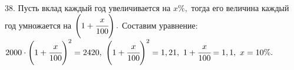 38. Пусть вклад каждый год увеличивается на $x\%,$ тогда его величина каждый год умножается на $\left(1+\cfrac{x}{100}\right).$ Составим уравнение:
$2000\cdot\left(1+\cfrac{x}{100}\right)^2=2420,\ \left(1+\cfrac{x}{100}\right)^2=1,21,\ 1+\cfrac{x}{100}=1,1,\ x=10\%.$\\
